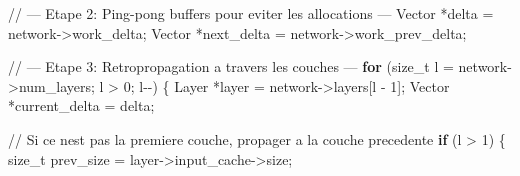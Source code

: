 \documentclass[
  letterpaper,
  DIV=11,
  numbers=noendperiod]{scrartcl}
\newenvironment{Shaded}{\begin{snugshade}}{\end{snugshade}}
\newcommand{\CommentTok}[1]{\textcolor[rgb]{0.37,0.37,0.37}{#1}}
\newcommand{\ControlFlowTok}[1]{\textcolor[rgb]{0.00,0.23,0.31}{\textbf{#1}}}
\newcommand{\DataTypeTok}[1]{\textcolor[rgb]{0.68,0.00,0.00}{#1}}
\newcommand{\DecValTok}[1]{\textcolor[rgb]{0.68,0.00,0.00}{#1}}
\newcommand{\NormalTok}[1]{\textcolor[rgb]{0.00,0.23,0.31}{#1}}
\newcommand{\OperatorTok}[1]{\textcolor[rgb]{0.37,0.37,0.37}{#1}}
\begin{document}
\begin{Shaded}
\begin{Highlighting}[]
    \CommentTok{// --- Etape 2: Ping-pong buffers pour eviter les allocations ---}
\NormalTok{    Vector }\OperatorTok{*}\NormalTok{delta      }\OperatorTok{=}\NormalTok{ network}\OperatorTok{{-}\textgreater{}}\NormalTok{work\_delta}\OperatorTok{;}
\NormalTok{    Vector }\OperatorTok{*}\NormalTok{next\_delta }\OperatorTok{=}\NormalTok{ network}\OperatorTok{{-}\textgreater{}}\NormalTok{work\_prev\_delta}\OperatorTok{;}

    \CommentTok{// --- Etape 3: Retropropagation a travers les couches ---}
    \ControlFlowTok{for} \OperatorTok{(}\DataTypeTok{size\_t}\NormalTok{ l }\OperatorTok{=}\NormalTok{ network}\OperatorTok{{-}\textgreater{}}\NormalTok{num\_layers}\OperatorTok{;}\NormalTok{ l }\OperatorTok{\textgreater{}} \DecValTok{0}\OperatorTok{;}\NormalTok{ l}\OperatorTok{{-}{-})} \OperatorTok{\{}
\NormalTok{        Layer }\OperatorTok{*}\NormalTok{layer }\OperatorTok{=}\NormalTok{ network}\OperatorTok{{-}\textgreater{}}\NormalTok{layers}\OperatorTok{[}\NormalTok{l }\OperatorTok{{-}} \DecValTok{1}\OperatorTok{];}
\NormalTok{        Vector }\OperatorTok{*}\NormalTok{current\_delta }\OperatorTok{=}\NormalTok{ delta}\OperatorTok{;}

        \CommentTok{// Si ce n\textquotesingle{}est pas la premiere couche, propager a la couche precedente}
        \ControlFlowTok{if} \OperatorTok{(}\NormalTok{l }\OperatorTok{\textgreater{}} \DecValTok{1}\OperatorTok{)} \OperatorTok{\{}
            \DataTypeTok{size\_t}\NormalTok{ prev\_size }\OperatorTok{=}\NormalTok{ layer}\OperatorTok{{-}\textgreater{}}\NormalTok{input\_cache}\OperatorTok{{-}\textgreater{}}\NormalTok{size}\OperatorTok{;}


\end{Highlighting}
\end{Shaded}
\end{document}
